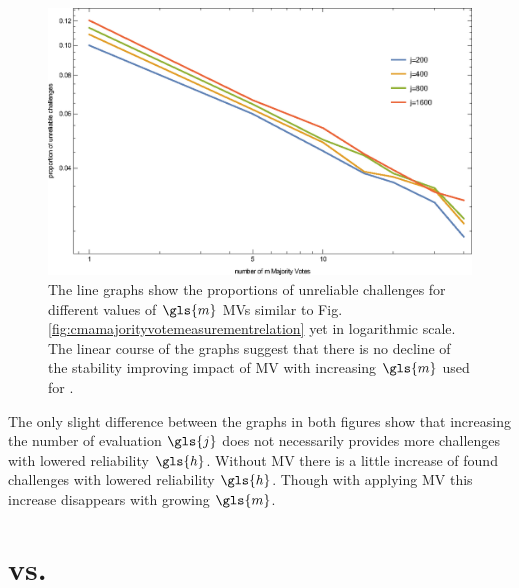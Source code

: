 \begin{figure}[ht]
\includegraphics[width=1.00\textwidth]{images/mv-measurements-unstableChallenges_loglog.eps}
\caption[Proportion of unreliable challenges logarithmic]{The line graphs show the proportions of unreliable challenges for different values of $\gls{m}$ \acp{MV} similar to Fig. \ref{fig:cmamajorityvotemeasurementrelation} yet in logarithmic scale. The linear course of the graphs suggest that there is no decline of the stability improving impact of \ac{MV} with increasing $\gls{m}$ used for \mpufs.}
\label{fig:cmamajorityvotemeasurementrelationloglog}
\end{figure}

The only slight difference between the graphs in both figures show that increasing the number of evaluation $\gls{j}$ does not necessarily provides more challenges with lowered reliability $\gls{h}$.
Without \ac{MV} there is a little increase of found challenges with lowered reliability $\gls{h}$.
Though with applying \ac{MV} this increase disappears with growing $\gls{m}$.


\section{\apufs vs. \mpufs}
\label{sec:arbitervsmajorityarbiter}

